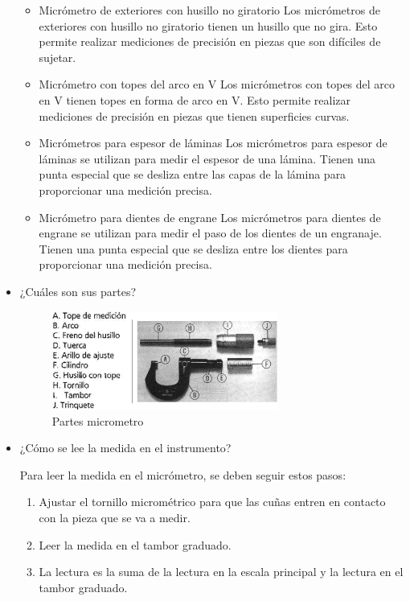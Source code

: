 \documentclass{article}
\theoremstyle{mytheoremstyle}
\theoremstyle{mytheoremstyle}
\theoremstyle{myproblemstyle}
\begin{document}
\begin{itemize}
\begin{itemize}
		      \item Micrómetro de exteriores con husillo no giratorio\newline
		            Los micrómetros de exteriores con husillo no giratorio tienen un husillo que no gira. Esto permite realizar mediciones de precisión en piezas que son difíciles de sujetar.
		      \item Micrómetro con topes del arco en V\newline
		            Los micrómetros con topes del arco en V tienen topes en forma de arco en V. Esto permite realizar mediciones de precisión en piezas que tienen superficies curvas.
		      \item Micrómetros para espesor de láminas\newline
		            Los micrómetros para espesor de láminas se utilizan para medir el espesor de una lámina. Tienen una punta especial que se desliza entre las capas de la lámina para proporcionar una medición precisa.
		      \item Micrómetro para dientes de engrane\newline
		            Los micrómetros para dientes de engrane se utilizan para medir el paso de los dientes de un engranaje. Tienen una punta especial que se desliza entre los dientes para proporcionar una medición precisa.

	      \end{itemize}


	\item ¿Cuáles son sus partes?
	      \begin{figure}[H]
		      \centering
		      \includegraphics[width=0.7\textwidth]{micrometro.png}
		      \caption{Partes micrometro}
		      \label{fig:imagen2}
	      \end{figure}

	\item¿Cómo se lee la medida en el instrumento?

	      Para leer la medida en el micrómetro, se deben seguir estos pasos:
	      \begin{enumerate}
		      \item Ajustar el tornillo micrométrico para que las cuñas entren en contacto con la pieza que se va a medir.
		      \item Leer la medida en el tambor graduado.
		      \item La lectura es la suma de la lectura en la escala principal y la lectura en el tambor graduado.
	      \end{enumerate}





\newpage
\end{itemize}

\nocite{*}

\end{document}
